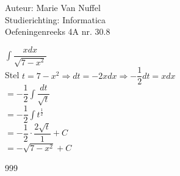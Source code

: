 \documentclass[a4paper]{article}
\begin{document}
  
\noindent \large Auteur: Marie Van Nuffel \\
\noindent \large Studierichting: Informatica\\
\noindent \large Oefeningenreeks 4A nr. 30.8\\

\medskip

\normalsize

$\displaystyle\int \dfrac{xdx}{\sqrt{7-x^2}}$\\

Stel $t = 7-x^2 \Rightarrow dt = -2x dx \Rightarrow -\dfrac{1}{2} dt = x dx $\\

$= -\dfrac{1}{2}\displaystyle\int \dfrac{dt}{\sqrt{t}}$\\

$= -\dfrac{1}{2}\displaystyle\int t^{\tfrac{1}{2}}$\\

$= -\dfrac{1}{2}\cdot\dfrac{2\sqrt{t}}{1} + C$\\

$= -\sqrt{7-x^2} + C$\\
                                        

\begin{thebibliography}{999}
\end{thebibliography}
\end{document}
